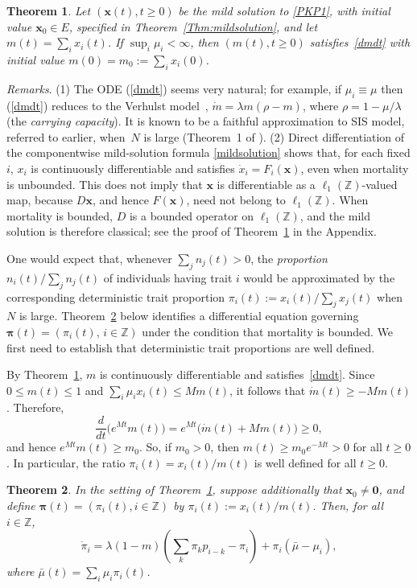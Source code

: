 \documentclass[12pt]{article}
\newtheorem{theorem}{Theorem}
\newcommand{\Z}{\ensuremath{\mathbb Z}}
\newcommand{\bpi}{\boldsymbol{\pi}}
\newcommand{\BS}{\ensuremath{\ell_1(\Z)}}
\newcommand{\bzero}{\boldsymbol{0}}
\newcommand{\bx}{\boldsymbol{x}}
\begin{document}
\begin{theorem}
\label{thm:dmdt}
Let $(\bx(t),t\geq 0)$ be the mild solution to \eqref{PKP1},
with initial value $\bx_0\in E$, specified in
Theorem~\ref{Thm:mildsolution}, and let
$m(t)=\sum_i x_i(t)$. If $\sup_i\mu_i<\infty$, then
$(m(t),t\geq 0)$ satisfies~\eqref{dmdt}
with initial value $m(0)=m_0:=\sum_i x_i(0)$.
\end{theorem}


\noindent
\emph{Remarks}.
(1) The ODE (\ref{dmdt}) seems very natural; for example, if
$\mu_i\equiv\mu$ then (\ref{dmdt}) reduces to the Verhulst
model~\cite{Ver1838}, $\dot{m}=\lambda m(\rho-m)$, where
$\rho=1-\mu/\lambda$ (the {\em carrying capacity\/}). It is known to be
a faithful approximation to SIS model, referred to earlier, when~$N$ is
large (Theorem~1 of \cite{Pol24}).
(2) Direct differentiation of the componentwise mild-solution formula
\eqref{mildsolution} shows that, for each fixed $i$, $x_i$ is
continuously differentiable and satisfies $\dot x_i=F_i(\bx)$, even when
mortality is unbounded. This does not imply that $\bx$ is differentiable
as a $\BS$-valued map, because $D\bx$, and hence $F(\bx)$, need not
belong to $\BS$. 
When mortality is bounded, $D$ is a bounded operator on
$\ell_1(\mathbb Z)$, and the mild solution is therefore classical; see
the proof of Theorem~\ref{thm:dmdt} in the Appendix.

\medskip
\noindent
One would expect that, whenever $\sum_j n_j(t)>0$, the \emph{proportion}
$n_i(t)/\sum_j n_j(t)$ of individuals having trait $i$ would be
approximated by the corresponding deterministic trait proportion
$\pi_i(t):=x_i(t)/\sum_j x_j(t)$ when $N$ is large.
Theorem~\ref{thm:pidot_continuum} below identifies a differential
equation governing $\bpi(t)=(\pi_i(t),\, i\in\Z)$ under the condition
that mortality is bounded. We first need to establish that deterministic
trait proportions are well defined.

By Theorem~\ref{thm:dmdt}, $m$ is continuously differentiable and 
satisfies~\eqref{dmdt}. Since $0\leq m(t)\leq 1$ and $\sum_i\mu_i x_i(t)\leq
Mm(t)$, it follows that $\dot m(t)\geq -Mm(t)$. Therefore,
$$
\frac{d}{dt}\bigl(e^{Mt}m(t)\bigr)
= e^{Mt}\bigl(\dot m(t) +M m(t) \bigr) \geq 0,
$$
and hence $e^{Mt}m(t)\geq m_0$. So, if $m_0>0$, then
$m(t)\geq m_0e^{-Mt}>0$ for all $t\geq 0$.
In particular, the ratio $\pi_i(t)={x_i(t)}/{m(t)}$ is well defined for all
$t\geq 0$.

\begin{theorem}
\label{thm:pidot_continuum}
In the setting of Theorem~\ref{thm:dmdt}, suppose additionally that
$\bx_0\neq\bzero$, and define $\bpi(t)=(\pi_i(t),i\in\mathbb Z)$ by
$\pi_i(t):=x_i(t)/m(t)$. Then, for all $i\in\mathbb Z$,
\begin{equation}
\dot\pi_i=
\lambda (1-m)\left( \sum_{k} \pi_k p_{i-k} - \pi_i \right) 
+ \pi_i (\bar\mu - \mu_i),
\label{pidot}
\end{equation}
where $\bar\mu(t)= \sum_i \mu_i \pi_i(t)$.
\end{theorem}
\end{document}
